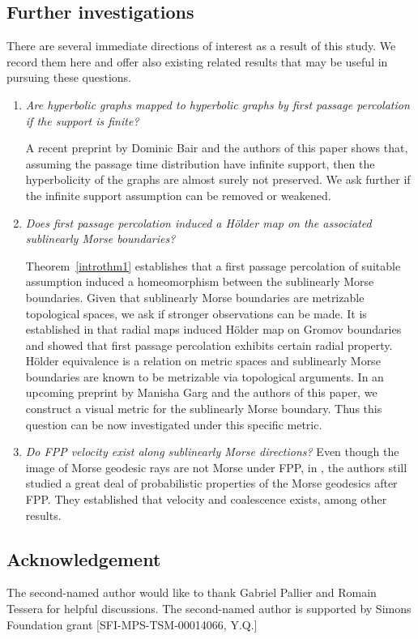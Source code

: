 \documentclass[12 pt]{amsart}
\theoremstyle{definition}
\theoremstyle{remark}
\begin{document}
\subsection*{Further investigations}
There are several immediate directions of interest as a result of this study. We record them here and offer also existing related results that may be useful in pursuing these questions.
\begin{enumerate}
\item \textit{Are hyperbolic graphs mapped to hyperbolic graphs by first passage percolation if the support is finite?}



 A recent preprint by Dominic Bair and the authors of this paper \cite{BJQ} shows that, assuming the passage time distribution have infinite support, then the hyperbolicity of the graphs are almost surely not preserved. We ask further if the infinite support assumption can be removed or weakened.
\item \textit{
Does first passage percolation induced a H\" older map on the associated sublinearly Morse boundaries?}



Theorem~\ref{introthm1} establishes that a first passage percolation of suitable assumption induced a homeomorphism between the sublinearly Morse boundaries. Given that sublinearly Morse boundaries are metrizable topological spaces, we ask if stronger observations can be made. It is established in \cite{DV15} that radial maps induced H\"older map on Gromov boundaries and \cite{BJQ} showed that first passage percolation exhibits certain radial property. H\"older equivalence is a relation on metric spaces and sublinearly Morse boundaries are known to be metrizable via topological arguments. In an upcoming preprint by Manisha Garg and the authors of this paper, we construct a visual metric for the sublinearly Morse boundary. Thus this question can be now investigated under this specific metric.


\item \textit{Do FPP velocity exist along sublinearly Morse directions?} Even though the image of Morse geodesic rays are not Morse under FPP, in \cite{BM1, BM2}, the authors still studied a great deal of probabilistic properties of the Morse geodesics after FPP. They established that velocity and coalescence exists, among other results. 
\end{enumerate}
\subsection{Acknowledgement} The second-named author would like to thank Gabriel Pallier and Romain Tessera for helpful discussions. The second-named author is supported by Simons Foundation grant [SFI-MPS-TSM-00014066, Y.Q.]
\end{document}
